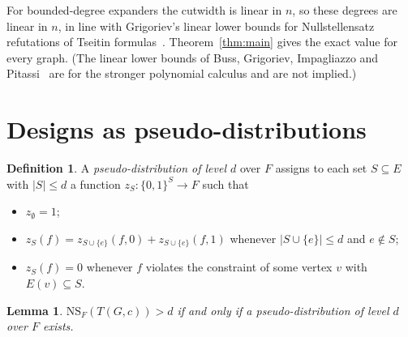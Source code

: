 \documentclass[11pt]{article}
\newtheorem{lemma}[theorem]{Lemma}
\theoremstyle{definition}
\newtheorem{definition}[theorem]{Definition}
\theoremstyle{remark}
\newcommand{\NS}{\mathrm{NS}}
\begin{document}
For bounded-degree expanders the cutwidth is linear in $n$, so these degrees
are linear in $n$, in line with Grigoriev's linear lower bounds for
Nullstellensatz refutations of Tseitin formulas~\cite{Gri98}.
Theorem~\ref{thm:main} gives the exact value for every graph. (The linear lower
bounds of Buss, Grigoriev, Impagliazzo and Pitassi~\cite{BGIP01} are for the
stronger polynomial calculus and are not implied.)

\section{Designs as pseudo-distributions}

\begin{definition}
A \emph{pseudo-distribution of level $d$} over $F$ assigns to each set
$S\subseteq E$ with $|S|\le d$ a function $z_S\colon\{0,1\}^S\to F$ such that
\begin{itemize}
\item $z_\emptyset=1$;
\item $z_S(f)=z_{S\cup\{e\}}(f,0)+z_{S\cup\{e\}}(f,1)$ whenever
$|S\cup\{e\}|\le d$ and $e\notin S$;
\item $z_S(f)=0$ whenever $f$ violates the constraint of some vertex $v$ with
$E(v)\subseteq S$.
\end{itemize}
\end{definition}

\begin{lemma}\label{lem:dual}
$\NS_F(T(G,c))>d$ if and only if a pseudo-distribution of level $d$ over $F$
exists.
\end{lemma}
\end{document}
